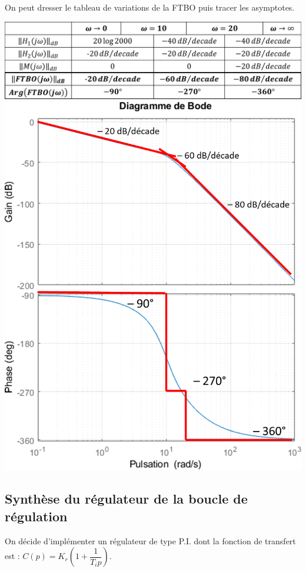 \documentclass[10pt,fleqn]{article} %
\begin{document}
\begin{multicols}{2}
\begin{corrige}
On peut dresser le tableau de variations de la FTBO puis tracer les asymptotes. 
\begin{center}
\includegraphics[width=\linewidth]{images/cor_01}
\includegraphics[width=\linewidth]{images/cor_02}
\end{center}
\end{corrige}
\else
\fi

\subsection*{Synthèse du régulateur de la boucle de régulation}

On décide d’implémenter un régulateur de type P.I. dont la fonction de transfert
est : $C(p)=K_r\left(1+\dfrac{1}{T_i p} \right)$.


\end{multicols}
\end{document}
